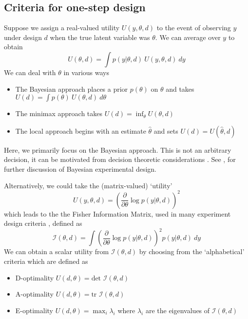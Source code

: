 \subsection{Criteria for one-step design}
Suppose we assign a real-valued utility $U(y, \theta, d)$ to the event of observing $y$ under design $d$ when the true latent variable was $\theta$. We can average over $y$ to obtain
\begin{equation}
	U(\theta, d) = \int p(y | \theta, d)\ U(y, \theta, d)\ dy
\end{equation}
We can deal with $\theta$ in various ways
\begin{itemize}
	\item The Bayesian approach \cite{chaloner1995} places a prior $p(\theta)$ on $\theta$ and takes $U(d) = \int p(\theta)\ U(\theta, d)\ d\theta$
	\item The minimax approach \cite{fedorov1972} takes $U(d) = \inf_\theta U(\theta, d)$
	\item The local approach \cite{pronzato2010} begins with an estimate $\hat{\theta}$ and sets $U(d) = U(\hat{\theta}, d)$
\end{itemize}
Here, we primarily focus on the Bayesian approach. This is not an arbitrary decision, it can be motivated from decision theoretic considerations \cite{lindley1972}. See \cite{chaloner1995}, \cite{ryan2015} for further discussion of Bayesian experimental design.

Alternatively, we could take the (matrix-valued) `utility'
\begin{equation}
	U(y, \theta, d) = \left( \frac{\partial}{\partial \theta} \log p(y | \theta, d) \right)^2
\end{equation}
which leads to the the Fisher Information Matrix, used in many experiment design criteria \cite{pronzato2010}, defined as
\begin{equation}
	\mathcal{I}(\theta, d) = \int \left( \frac{\partial}{\partial \theta} \log p(y | \theta, d) \right)^2 p(y | \theta, d)\ dy
\end{equation}
We can obtain a scalar utility from $\mathcal{I}(\theta, d)$ by choosing from the `alphabetical' criteria \cite{box1982} which are defined as
\begin{itemize}
	\item D-optimality $U(d, \theta) = \text{det } \mathcal{I}(\theta, d)$
	\item A-optimality $U(d, \theta) = \text{tr } \mathcal{I}(\theta, d)$
	\item E-optimality $U(d, \theta) = \max_i \lambda_i$ where $\lambda_i$ are the eigenvalues of $\mathcal{I}(\theta, d)$
\end{itemize}

